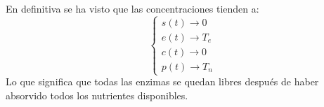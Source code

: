 En definitiva se ha visto que las concentraciones tienden a:
\[
\left\{
\begin{array}{l}
s(t)\longrightarrow 0\\
e(t)\longrightarrow T_e\\
c(t)\longrightarrow 0\\
p(t)\longrightarrow T_n
\end{array}
\right.
\]
Lo que significa que todas las enzimas se quedan libres después de haber absorvido todos los nutrientes disponibles.



